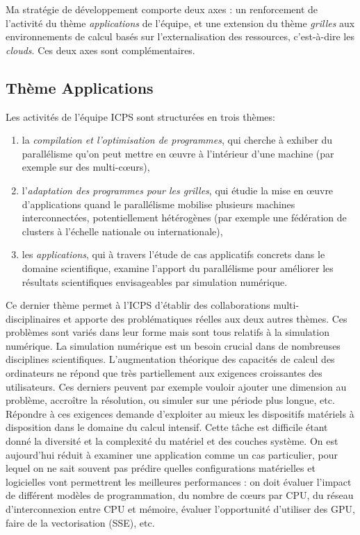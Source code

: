 \documentclass[11pt]{article}
\begin{document}
Ma stratégie de développement comporte deux axes : un renforcement de 
l'activité du thème \textit{applications} de l'équipe, et une extension
du thème \textit{grilles} aux environnements de calcul basés sur 
l'externalisation des ressources, c'est-à-dire les \emph{clouds}. Ces deux
axes sont complémentaires.


\subsection*{Thème Applications}
Les activités de l'équipe ICPS sont structurées en trois thèmes: 
\begin{enumerate}
\item la \textit{compilation et l'optimisation de programmes}, qui 
cherche à exhiber du parallélisme qu'on peut mettre en {\oe}uvre à 
l'intérieur d'une machine (par exemple sur des multi-c{\oe}urs),
\item l'\textit{adaptation des programmes pour les grilles}, qui 
étudie la mise en {\oe}uvre d'applications quand le parallélisme mobilise 
plusieurs machines interconnectées, potentiellement hétérogènes (par 
exemple une fédération de clusters à l'échelle nationale ou internationale), 
\item les \textit{applications}, qui à travers l'étude de cas 
applicatifs concrets dans le domaine scientifique, examine 
l'apport du parallélisme pour améliorer les résultats scientifiques
envisageables par simulation numérique.
\end{enumerate}

Ce dernier thème permet à l'ICPS d'établir des collaborations multi-%
disciplinaires et apporte des problématiques réelles aux deux autres 
thèmes. Ces problèmes sont variés dans leur forme mais sont tous
relatifs à la simulation numérique.
La simulation numérique est un besoin crucial dans de nombreuses 
disciplines scientifiques. L'augmentation théorique des capacités
de calcul des ordinateurs ne répond que très partiellement aux
exigences croissantes des utilisateurs. Ces derniers peuvent par
exemple vouloir ajouter une dimension au problème, accroître la 
résolution, ou simuler sur une période plus longue, etc. Répondre 
à ces exigences demande d'exploiter au mieux les dispositifs 
matériels à disposition dans le domaine du calcul intensif.
Cette tâche est difficile étant donné la diversité et la complexité
du matériel et des couches système. On est aujourd'hui réduit à examiner 
une application comme un cas particulier, pour lequel on ne sait souvent
pas prédire quelles configurations matérielles et logicielles vont 
permettrent les meilleures performances : on doit évaluer l'impact de
différent modèles de programmation, du nombre de c{\oe}urs par CPU,
du réseau d'interconnexion entre CPU et mémoire, évaluer l'opportunité
d'utiliser des GPU, faire de la vectorisation (SSE), etc.\\
\end{document}
